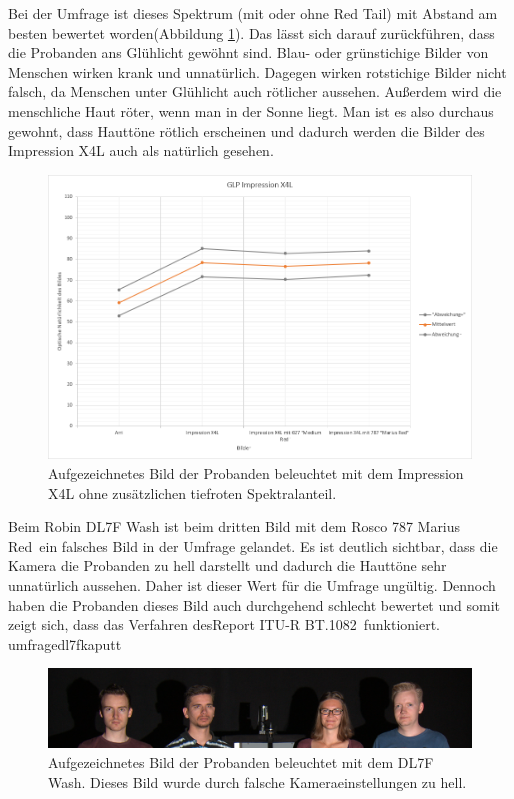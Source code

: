 Bei der Umfrage ist dieses Spektrum (mit oder ohne \glqq Red Tail\grqq) mit Abstand am besten bewertet worden(Abbildung \ref{b_umfrageglp}). Das lässt sich darauf zurückführen, dass die Probanden ans Glühlicht gewöhnt sind. Blau- oder grünstichige Bilder von Menschen wirken krank und unnatürlich. Dagegen wirken rotstichige Bilder nicht falsch, da Menschen unter Glühlicht auch rötlicher aussehen. Außerdem wird die menschliche Haut röter, wenn man in der Sonne liegt. Man ist es also durchaus gewohnt, dass Hauttöne rötlich erscheinen und dadurch werden die Bilder des Impression X4L auch als natürlich gesehen. 

\begin{figure}[H]     %
\centering
\includegraphics[width=1.0\textwidth]{bilder/umfrageglp} 
\caption {Aufgezeichnetes Bild der Probanden beleuchtet mit dem Impression X4L ohne zusätzlichen tiefroten Spektralanteil.} \label{b_umfrageglp}
\end{figure}


Beim Robin DL7F Wash ist beim dritten Bild mit dem Rosco 787 \glqq Marius Red\grqq\ ein falsches Bild in der Umfrage gelandet. Es ist deutlich sichtbar, dass die Kamera die Probanden zu hell darstellt und dadurch die Hauttöne sehr unnatürlich aussehen. Daher ist dieser Wert für die Umfrage ungültig. Dennoch haben die Probanden dieses Bild auch durchgehend schlecht bewertet und somit zeigt sich, dass das Verfahren des\glqq Report ITU-R BT.1082\grqq\ funktioniert.
umfragedl7fkaputt

\begin{figure}[H]     %
\centering
\includegraphics[width=1.0\textwidth]{bilder/umfragedl7fkaputt} 
\caption {Aufgezeichnetes Bild der Probanden beleuchtet mit dem DL7F Wash. Dieses Bild wurde durch falsche Kameraeinstellungen zu hell.} \label{b_umfragedl7fkaputt}
\end{figure}



